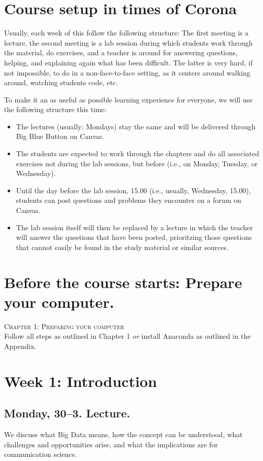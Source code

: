 \section*{Course setup in times of Corona}
Usually, each week of this follow the following structure: The first meeting is a lecture, the second meeting is a lab session during which students work through the material, do exercises, and a teacher is around for answering questions, helping, and explaining again what has been difficult. The latter is very hard, if not impossible, to do in a non-face-to-face setting, as it centers around walking around, watching students code, etc.

To make it an as useful as possible learning experience for everyone, we will use the following structure this time:

\begin{itemize}
\item The lectures (usually: Mondays) stay the same and will be delivered through Big Blue Button on Canvas.
\item The students are expected to work through the chapters and do all associated exercises not during the lab sessions, but before (i.e., on Monday, Tuesday, or Wednesday).
\item Until the day before the lab session, 15.00 (i.e., usually, Wednesday, 15.00), students can post questions and problems they encounter on a forum on Canvas.
\item The lab session itself will then be replaced by a lecture in which the teacher will answer the questions that have been posted, prioritzing those questions that cannot easily be found in the study material or similar sources.
\end{itemize}


\section*{Before the course starts: Prepare your computer.}
\textsc{ Chapter 1: Preparing your computer}\\
Follow all steps as outlined in Chapter 1 \emph{or} install Anaconda as outlined in the Appendix.


\section*{Week 1: Introduction}
\subsection*{Monday, 30--3. Lecture.}
We discuss what Big Data means, how the concept can be understood, what challenges and opportunities arise, and what the implications are for communication science. 

